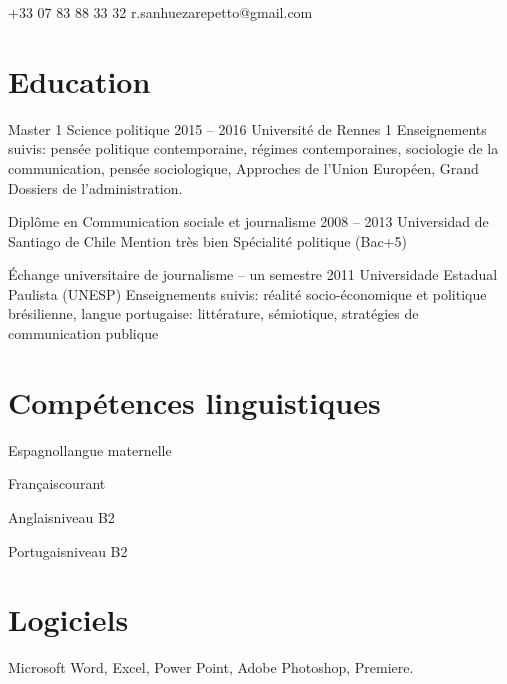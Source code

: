 \documentclass{tccv}
\begin{document}
    {+33 07 83 88 33 32}
    {r.sanhuezarepetto@gmail.com}

\section{Education}

\begin{yearlist}

\item[Master 1 Science politique]{2015 -- 2016}
     {Université de Rennes 1}
     {Enseignements suivis: pensée politique contemporaine, régimes contemporaines, sociologie de la communication, pensée sociologique, Approches de l’Union Européen, Grand Dossiers de l’administration.}


  

\item[Diplôme en Communication sociale et journalisme]{2008 -- 2013}
     {Universidad de Santiago de Chile}
     {Mention très bien
      Spécialité politique
      (Bac+5)}
   
     
\item[Échange universitaire de journalisme – un semestre]{2011}
     {Universidade Estadual Paulista (UNESP)}
     {Enseignements suivis: réalité socio-économique et politique brésilienne, langue portugaise: littérature, sémiotique, stratégies de communication publique}





     
     
     

\end{yearlist}



\section{Compétences linguistiques}

\begin{factlist}
\item{Espagnol}{langue maternelle}	
\item{Français}{courant}	
\item{Anglais}{niveau B2}	
\item{Portugais}{niveau B2}
\end{factlist}

\section{Logiciels}

\begin{factlist}

\item{}{Microsoft Word, Excel, Power Point, Adobe Photoshop, Premiere.}


\end{factlist}
\end{document}
